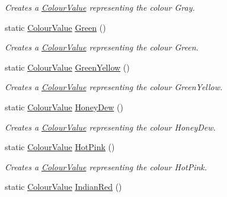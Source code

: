 \begin{DoxyCompactItemize}
\begin{DoxyCompactList}\small\item\em Creates a \hyperlink{classMezzanine_1_1ColourValue}{ColourValue} representing the colour Gray. \item\end{DoxyCompactList}\item 
static \hyperlink{classMezzanine_1_1ColourValue}{ColourValue} \hyperlink{classMezzanine_1_1ColourValue_a42d1f48b74ca68a09730c1bd520f53ab}{Green} ()
\begin{DoxyCompactList}\small\item\em Creates a \hyperlink{classMezzanine_1_1ColourValue}{ColourValue} representing the colour Green. \item\end{DoxyCompactList}\item 
static \hyperlink{classMezzanine_1_1ColourValue}{ColourValue} \hyperlink{classMezzanine_1_1ColourValue_a05a6c13e5cf533973bdab2fe89a6e3f2}{GreenYellow} ()
\begin{DoxyCompactList}\small\item\em Creates a \hyperlink{classMezzanine_1_1ColourValue}{ColourValue} representing the colour GreenYellow. \item\end{DoxyCompactList}\item 
static \hyperlink{classMezzanine_1_1ColourValue}{ColourValue} \hyperlink{classMezzanine_1_1ColourValue_a6c9af0ca9cbd3e2f7a0abe5e032a40a4}{HoneyDew} ()
\begin{DoxyCompactList}\small\item\em Creates a \hyperlink{classMezzanine_1_1ColourValue}{ColourValue} representing the colour HoneyDew. \item\end{DoxyCompactList}\item 
static \hyperlink{classMezzanine_1_1ColourValue}{ColourValue} \hyperlink{classMezzanine_1_1ColourValue_acfcddbde1b02656262226c3b2113eebf}{HotPink} ()
\begin{DoxyCompactList}\small\item\em Creates a \hyperlink{classMezzanine_1_1ColourValue}{ColourValue} representing the colour HotPink. \item\end{DoxyCompactList}\item 
static \hyperlink{classMezzanine_1_1ColourValue}{ColourValue} \hyperlink{classMezzanine_1_1ColourValue_acc2b04525f18677536ba3747fe3c54cd}{IndianRed} ()

\end{DoxyCompactItemize}
